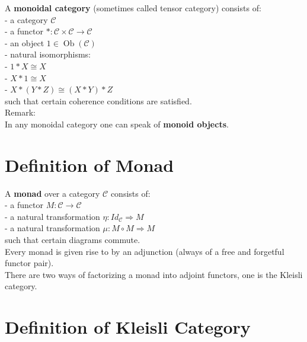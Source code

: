 \documentclass[a4paper, twoside, english, 11pt]{book}
\DeclareMathOperator{\Ob}{Ob}
\newcommand{\C}{\mathcal C}
\begin{document}
A \textbf{monoidal category} (sometimes called tensor category) consists of: \\

- a category $\C$ \\

- a functor $* : \C \times \C \rightarrow \C$ \\

- an object $1 \in \Ob(\C)$ \\ %

- natural isomorphisms: \\

\indent\indent
- $1 * X \cong X$ \\

\indent\indent
- $X * 1 \cong X$ \\

\indent\indent
- $X * (Y * Z) \cong (X * Y) * Z$ \\

\noindent
such that certain coherence conditions are satisfied. \\

\noindent
Remark: \\
In any monoidal category one can speak of \textbf{monoid objects}.



\section{Definition of Monad}

A \textbf{monad} over a category $\C$ consists of: \\

- a functor $M : \C \rightarrow \C$ \\

- a natural transformation $\eta : Id_\C \Rightarrow M$ \\

- a natural transformation $\mu : M \circ M \Rightarrow M$ \\

such that certain diagrams commute. \\

\noindent
Every monad is given rise to by an adjunction (always of a free and forgetful functor pair). \\
There are two ways of factorizing a monad into adjoint functors, one is the Kleisli category.



\section{Definition of Kleisli Category}
\end{document}
